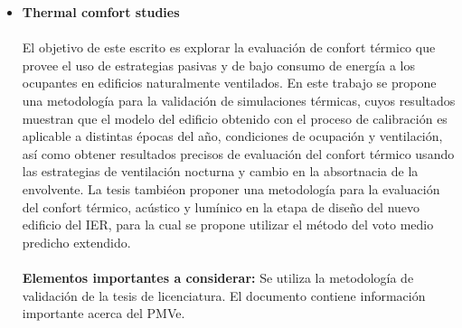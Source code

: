 \documentclass[10pt,twoside]{tesisIER}
\begin{document}
\begin{itemize}
\item \textbf{Thermal comfort studies}
\\\\
El objetivo de este escrito es explorar la evaluación de confort térmico que provee el uso de estrategias pasivas y de bajo consumo de energía a los ocupantes en edificios naturalmente ventilados. En este trabajo se propone una metodología para la validación de simulaciones térmicas, cuyos resultados  muestran que el modelo del edificio obtenido con el proceso de calibración es aplicable a distintas épocas del año, condiciones de ocupación y ventilación, así como obtener resultados precisos de evaluación del confort térmico usando las estrategias de ventilación nocturna y cambio en la absortnacia de la envolvente. La tesis tambiéon proponer una metodología para la evaluación del confort térmico, acústico y lumínico en la etapa de diseño del nuevo edificio del IER, para la cual se propone utilizar el método del voto medio predicho extendido.
\\\\
\textbf{Elementos importantes a considerar:} Se utiliza la metodología de validación de la tesis de licenciatura. El documento contiene información importante acerca del PMVe.


\end{itemize}


\newpage
\thispagestyle{empty}
\end{document}
